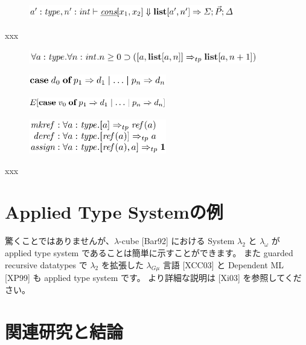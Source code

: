 \documentclass[submit,techreq,noauthor,onecolumn]{ipsj}
\begin{document}
\begin{figure}[h]
\centering
\includegraphics[width=9cm]{img/infig3_lemma4_judgement.png}
\end{figure}

xxx

\begin{figure}[h]
\centering
\includegraphics[width=10cm]{img/infig3_lemma4_cons_dctype.png}
\end{figure}

\begin{figure}[h]
\centering
\includegraphics[width=6cm]{img/infig3_lemma4_theorem1.png}
\end{figure}

\begin{figure}[h]
\centering
\includegraphics[width=6cm]{img/infig3_lemma4_theorem2.png}
\end{figure}

\begin{figure}[h]
\centering
\includegraphics[width=6cm]{img/infig3_effect_dctype.png}
\end{figure}

xxx

\section{Applied Type Systemの例}

驚くことではありませんが、$\lambda$-cube [Bar92] における System $\lambda_2$ と $\lambda_{\omega}$ が applied type system であることは簡単に示すことができます。
また guarded recursive datatypes で $\lambda_2$ を拡張した $\lambda_{G\mu}$ 言語 [XCC03] と Dependent ML [XP99] も applied type system です。
より詳細な説明は [Xi03] を参照してください。

\section{関連研究と結論}
\end{document}
